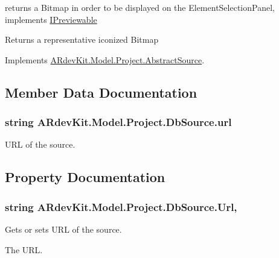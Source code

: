 returns a Bitmap in order to be displayed on the Element\-Selection\-Panel, implements \hyperlink{interface_a_rdev_kit_1_1_model_1_1_project_1_1_i_previewable}{I\-Previewable} 

\begin{DoxyReturn}{Returns}
a representative iconized Bitmap 
\end{DoxyReturn}


Implements \hyperlink{class_a_rdev_kit_1_1_model_1_1_project_1_1_abstract_source_ae698f1c9d55cc0603931bd2804d0c35d}{A\-Rdev\-Kit.\-Model.\-Project.\-Abstract\-Source}.



\subsection{Member Data Documentation}
\hypertarget{class_a_rdev_kit_1_1_model_1_1_project_1_1_db_source_ac6b9cc43f2dee23b83d8783c81a07407}{
\subsubsection[{url}]{\setlength{\rightskip}{0pt plus 5cm}string A\-Rdev\-Kit.\-Model.\-Project.\-Db\-Source.\-url\hspace{0.3cm}{\ttfamily [protected]}}}\label{class_a_rdev_kit_1_1_model_1_1_project_1_1_db_source_ac6b9cc43f2dee23b83d8783c81a07407}


U\-R\-L of the source. 



\subsection{Property Documentation}
\hypertarget{class_a_rdev_kit_1_1_model_1_1_project_1_1_db_source_a3a58d6e8914c028e06dbd9ebfef1f4bd}{
\subsubsection[{Url}]{\setlength{\rightskip}{0pt plus 5cm}string A\-Rdev\-Kit.\-Model.\-Project.\-Db\-Source.\-Url\hspace{0.3cm}{\ttfamily [get]}, {\ttfamily [set]}}}\label{class_a_rdev_kit_1_1_model_1_1_project_1_1_db_source_a3a58d6e8914c028e06dbd9ebfef1f4bd}


Gets or sets U\-R\-L of the source. 

The U\-R\-L. 
